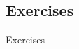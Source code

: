 \documentclass[
	11pt, %
]{beamer}
\begin{document}
\begin{frame}
    \section{Exercises}
	\begin{center}
		{\Huge Exercises}
	\end{center}
\end{frame}


%
%
%
%
%
%
%
%
%
\end{document}
